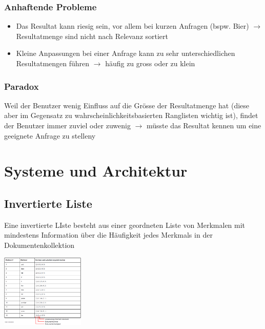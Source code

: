 \documentclass{report}
\newenvironment{Figure}
	{\par\medskip\noindent\minipage{\linewidth}}
	{\endminipage\par\medskip}
\theoremstyle{definition}
\theoremstyle{example}
\begin{document}
\subsection{Anhaftende Probleme}
\begin{itemize}
   \item Das Resultat kann riesig sein, vor allem bei kurzen Anfragen (bspw. Bier) $\rightarrow$ Resultatmenge sind nicht nach Relevanz sortiert
   \item Kleine Anpassungen bei einer Anfrage kann zu sehr unterschiedlichen Resultatmengen führen $\rightarrow$ häufig zu gross oder zu klein
\end{itemize}

\subsection{Paradox}
Weil der Benutzer wenig Einfluss auf die Grösse der Resultatmenge hat (diese aber im Gegensatz zu wahrscheinlichkeitsbasierten Ranglisten wichtig ist), findet der Benutzer immer zuviel oder zuwenig $\rightarrow$ müsste das Resultat kennen um eine geeignete Anfrage zu stelleny


\chapter{Systeme und Architektur}

\section{Invertierte Liste}
Eine invertierte LIste besteht aus einer geordneten Liste von Merkmalen mit mindestens Information über die Häufigkeit jedes Merkmals in der Dokumentenkollektion

\begin{Figure}
   \centering
    \includegraphics[width=150px]{img/invertierteListe.png}
        \label{fig:Abbildung einer beispielhaften invertierten Liste}
\end{Figure}
\end{document}
